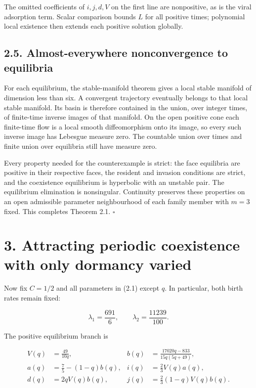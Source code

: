 \documentclass[
  11pt,
]{article}
\begin{document}
The omitted coefficients of \(i,j,d,V\) on the first line are
nonpositive, as is the viral adsorption term. Scalar comparison bounds
\(L\) for all positive times; polynomial local existence then extends
each positive solution globally.

\subsection{2.5. Almost-everywhere nonconvergence to
equilibria}\label{almost-everywhere-nonconvergence-to-equilibria}

For each equilibrium, the stable-manifold theorem gives a local stable
manifold of dimension less than six. A convergent trajectory eventually
belongs to that local stable manifold. Its basin is therefore contained
in the union, over integer times, of finite-time inverse images of that
manifold. On the open positive cone each finite-time flow is a local
smooth diffeomorphism onto its image, so every such inverse image has
Lebesgue measure zero. The countable union over times and finite union
over equilibria still have measure zero.

Every property needed for the counterexample is strict: the face
equilibria are positive in their respective faces, the resident and
invasion conditions are strict, and the coexistence equilibrium is
hyperbolic with an unstable pair. The equilibrium elimination is
nonsingular. Continuity preserves these properties on an open admissible
parameter neighbourhood of each family member with \(m=3\) fixed. This
completes Theorem 2.1. \(\square\)

\section{3. Attracting periodic coexistence with only dormancy
varied}\label{attracting-periodic-coexistence-with-only-dormancy-varied}

Now fix \(C=1/2\) and all parameters in (2.1) except \(q\). In
particular, both birth rates remain fixed:

\[
\lambda_1=\frac{691}{6},\qquad \lambda_2=\frac{11239}{100}.
\]

The positive equilibrium branch is

\[
\begin{aligned}
V(q)&=\frac{49}{10q},&
b(q)&=\frac{17020q-833}{15q(5q+49)},\\
a(q)&=\frac75-(1-q)b(q),&
i(q)&=\frac23V(q)a(q),\\
d(q)&=2qV(q)b(q),&
j(q)&=\frac23(1-q)V(q)b(q).
\end{aligned} \tag{3.1}
\]
\end{document}
